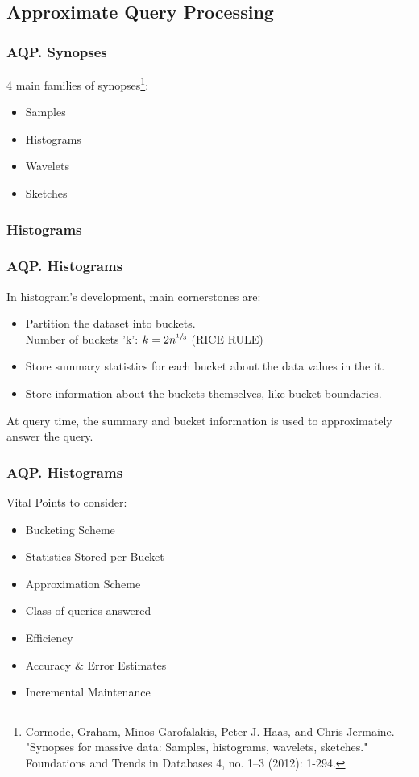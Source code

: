 \documentclass{beamer}
\begin{document}
\subsection{Approximate Query Processing}
\begin{frame}
\frametitle{AQP. Synopses}
4 main families of synopses\footnote{\tiny Cormode, Graham, Minos Garofalakis, Peter J. Haas, and Chris Jermaine. "Synopses for massive data:
Samples, histograms, wavelets, sketches." Foundations and Trends in Databases 4, no. 1–3 (2012): 1-294.}:
\begin{itemize}
\vspace{0.3 cm}
\item{Samples}
\item{Histograms \checkmark}
\item{Wavelets}
\item{Sketches \checkmark}
\end{itemize}
\end{frame}
\subsubsection{Histograms}
\begin{frame}
\frametitle{AQP. Histograms}
	In histogram's development, main cornerstones are:
	\begin{itemize}
		\item {Partition the dataset into buckets.\\Number of buckets 'k':
	\hspace{0.2 cm} $k = 2n^{\sfrac{1}{3}}$ \hspace{0.3 cm} (RICE RULE)}
		\item {Store summary statistics for each bucket about the data values in the it.}
		\item {Store information about the buckets themselves, like bucket boundaries.}
	\end{itemize}
	At query time, the summary and bucket information is used to approximately answer the query.
\end{frame}

\begin{frame}
\frametitle{AQP. Histograms}
	Vital Points to consider:
	\begin{itemize}
		\item Bucketing Scheme
		\item Statistics Stored per Bucket
		\item Approximation Scheme
		\item Class of queries answered		
		\item Efficiency
		\item Accuracy \& Error Estimates
		\item Incremental Maintenance
	\end{itemize}
\end{frame}
\end{document}
